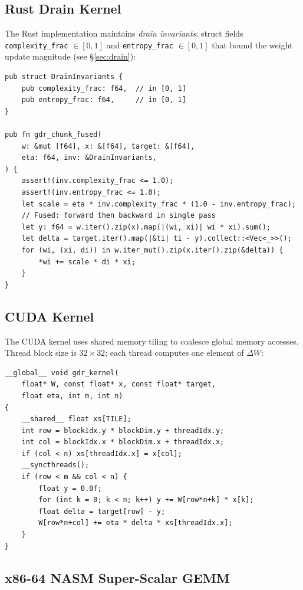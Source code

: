 \documentclass[10pt,conference]{IEEEtran}
\begin{document}
\subsection{Rust Drain Kernel}

The Rust implementation maintains \emph{drain invariants}: struct fields
\texttt{complexity\_frac} $\in [0,1]$ and \texttt{entropy\_frac} $\in [0,1]$
that bound the weight update magnitude (see \S\ref{sec:drain}):

\begin{lstlisting}[style=rust,caption={Rust GDR drain kernel (excerpt)}]
pub struct DrainInvariants {
    pub complexity_frac: f64,  // in [0, 1]
    pub entropy_frac: f64,     // in [0, 1]
}

pub fn gdr_chunk_fused(
    w: &mut [f64], x: &[f64], target: &[f64],
    eta: f64, inv: &DrainInvariants,
) {
    assert!(inv.complexity_frac <= 1.0);
    assert!(inv.entropy_frac <= 1.0);
    let scale = eta * inv.complexity_frac * (1.0 - inv.entropy_frac);
    // Fused: forward then backward in single pass
    let y: f64 = w.iter().zip(x).map(|(wi, xi)| wi * xi).sum();
    let delta = target.iter().map(|&ti| ti - y).collect::<Vec<_>>();
    for (wi, (xi, di)) in w.iter_mut().zip(x.iter().zip(&delta)) {
        *wi += scale * di * xi;
    }
}
\end{lstlisting}

\subsection{CUDA Kernel}

The CUDA kernel uses shared memory tiling to coalesce global memory accesses.
Thread block size is $32 \times 32$; each thread computes one element of
$\Delta W$:

\begin{lstlisting}[style=cuda,caption={CUDA GDR kernel (excerpt)}]
__global__ void gdr_kernel(
    float* W, const float* x, const float* target,
    float eta, int m, int n)
{
    __shared__ float xs[TILE];
    int row = blockIdx.y * blockDim.y + threadIdx.y;
    int col = blockIdx.x * blockDim.x + threadIdx.x;
    if (col < n) xs[threadIdx.x] = x[col];
    __syncthreads();
    if (row < m && col < n) {
        float y = 0.0f;
        for (int k = 0; k < n; k++) y += W[row*n+k] * x[k];
        float delta = target[row] - y;
        W[row*n+col] += eta * delta * xs[threadIdx.x];
    }
}
\end{lstlisting}

\subsection{x86-64 NASM Super-Scalar GEMM}
\end{document}
